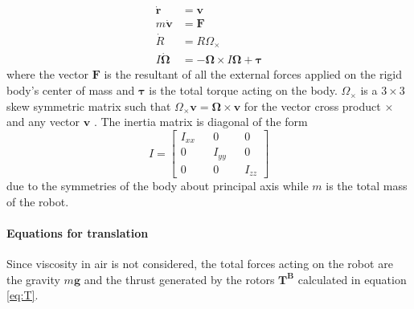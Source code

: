 \begin{align}
\label{eq:rigidb1}
\boldsymbol{\dot{r}}& = \boldsymbol{v}\\ \label{eq:rigidb2}
m\boldsymbol{\dot{v}}& = \boldsymbol{F}\\ 
\label{eq:rigidb3}
\dot{R}& = R\Omega_\times\\ 
\label{eq:rigidb4}
I\boldsymbol{\dot{\Omega}}& = -\boldsymbol{\Omega} \times I\boldsymbol{\Omega} + \boldsymbol{\tau}
\end{align}
\noindent
where the vector $\boldsymbol{F}$ is the resultant of all the external forces applied on the rigid body's center of mass and $\boldsymbol{\tau}$ is the total torque acting on the body. $\Omega_\times$ is a $3\times3$ skew symmetric matrix such that $\Omega_\times \boldsymbol{v} = \boldsymbol{\Omega} \times \boldsymbol{v}$ for the vector cross product $\times$ and any vector $\boldsymbol{v}$ \cite{Mahony2012}. The inertia matrix is diagonal of the form
\begin{equation}
	I=\begin{bmatrix}
	I_{xx}&&0&&0\\0&&I_{yy}&&0\\0&&0&&I_{zz}
	\end{bmatrix}
\end{equation}
due to the symmetries of the body about principal axis while $m$ is the total mass of the robot.

\paragraph{Equations for translation}

Since viscosity in air is not considered, the total forces acting on the robot are the gravity $m\boldsymbol{g}$ and the thrust generated by the rotors $\boldsymbol{T^B}$ calculated in equation \eqref{eq:T}. \\

